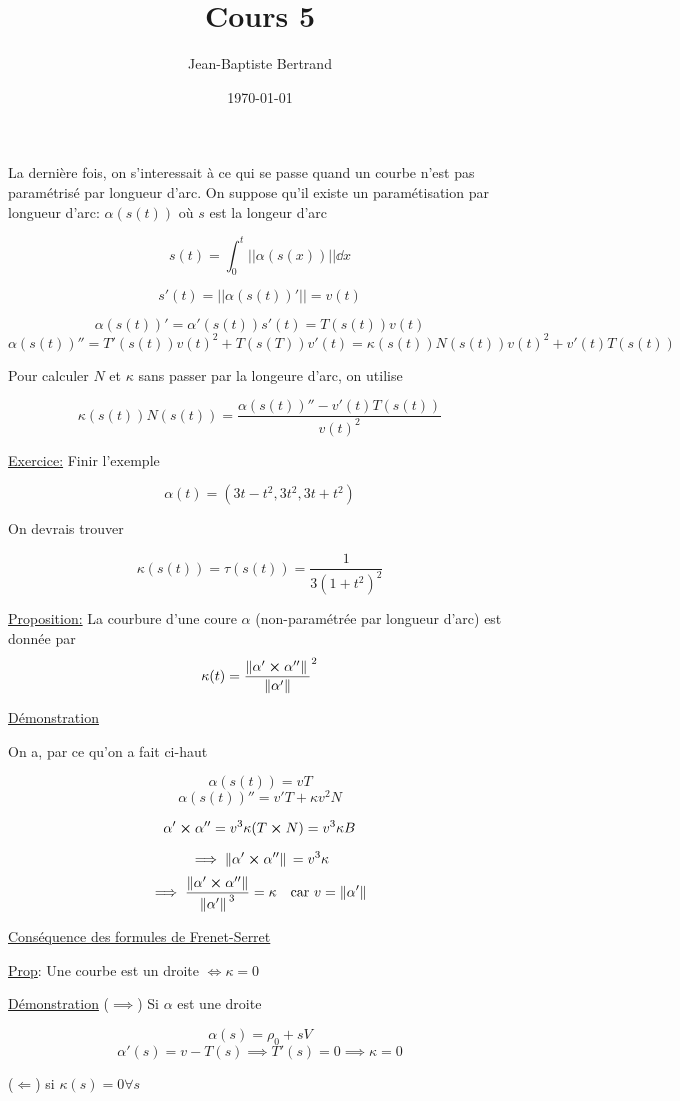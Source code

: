 \documentclass{article}
\title{Cours 5}
\author{Jean-Baptiste Bertrand}
\date{\today}
\begin{document}
\maketitle

La dernière fois, on s'interessait à ce qui se passe quand un courbe n'est pas paramétrisé par longueur d'arc. On suppose qu'il existe un paramétisation par longueur d'arc: $\alpha(s(t))$ où $s$ est la longeur d'arc

$$s(t) = \int_0^t ||\alpha(s(x))|| \dd x$$

$$s'(t) = ||\alpha(s(t))'|| = v(t)$$

$$\alpha(s(t))'=\alpha'(s(t))s'(t)=T(s(t))v(t)$$
$$\alpha(s(t))'' = T'(s(t))v(t)^2 + T(s(T))v'(t) = \kappa(s(t))N(s(t))v(t)^2 + v'(t)T(s(t))$$

Pour calculer $N$ et $\kappa$ sans passer par la longeure d'arc, on utilise

$$\kappa(s(t))N(s(t))= \frac{\alpha(s(t))''-v'(t)T(s(t))}{v(t)^2}$$

\underline{Exercice:} Finir l'exemple

$$\alpha(t) = (3t-t^2, 3t^2, 3t+t^2)$$

On devrais trouver

$$\kappa(s(t))=\tau(s(t))=\frac{1}{3(1+t^2)^2}$$


\underline{Proposition:} La courbure d'une coure $\alpha$ (non-paramétrée par longueur d'arc) est donnée par $$\kappa(t)=\frac{\norm*{\alpha' \cross \alpha''}}{\norm{\alpha'}}^2$$

\underline{Démonstration} 

On a, par ce qu'on a fait ci-haut

$$\alpha(s(t))=vT$$
$$\alpha(s(t))''=v'T + \kappa v^2 N$$

$$\alpha' \cross \alpha'' = v^3 \kappa(T\cross N)= v^3 \kappa B$$

$$\implies \norm*{\alpha' \cross \alpha''} = v^3\kappa$$
$$\implies \frac{\norm{\alpha'\cross\alpha''}}{\norm*{\alpha'}^3}=\kappa \quad \text{car } v = \norm*{\alpha'}$$


\underline{Conséquence des formules de Frenet-Serret}

\underline{Prop}: Une courbe est un droite $\iff \kappa =0$

\underline{Démonstration} ($\implies$) Si $\alpha$ est une droite

$$\alpha(s) = \rho_0 + sV$$
$$\alpha'(s) = v-T(s) \implies T'(s)=0 \implies \kappa =0$$

($\Longleftarrow$)
si $\kappa(s) =0 \forall s$
\end{document}
